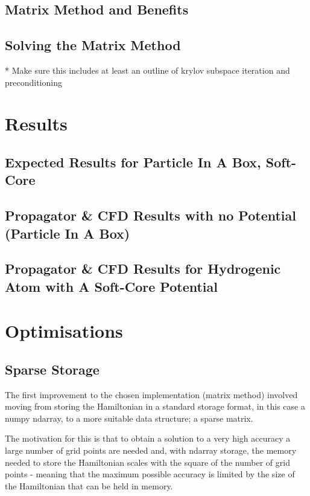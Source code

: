 \subsection{Matrix Method and Benefits}

\subsection{Solving the Matrix Method}
* Make sure this includes at least an outline of krylov subspace iteration and preconditioning

\section{Results}
\subsection{Expected Results for Particle In A Box, Soft-Core}

\subsection{Propagator \& CFD Results with no Potential (Particle In A Box)}

\subsection{Propagator \& CFD Results for Hydrogenic Atom with A Soft-Core Potential}

\section{Optimisations}

\subsection{Sparse Storage}
The first improvement to the chosen implementation (matrix method) involved moving from storing the Hamiltonian in a standard storage format, in this case a numpy ndarray, to a more suitable data structure; a sparse matrix. 

The motivation for this is that to obtain a solution to a very high accuracy a large number of grid points are needed and, with ndarray storage, the memory needed to store the Hamiltonian scales with the square of the number of grid points - meaning that the maximum possible accuracy is limited by the size of the Hamiltonian that can be held in memory. 

